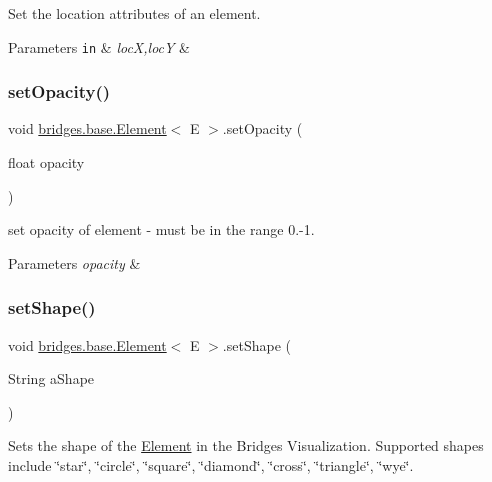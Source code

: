 Set the location attributes of an element. 


\begin{DoxyParams}[1]{Parameters}
\mbox{\tt in}  & {\em locX,locY} & \\
\hline
\end{DoxyParams}
\mbox{\label{classbridges_1_1base_1_1_element_a71c622f2cbb03b086c5a8f80d390b366}} 
\subsubsection{\texorpdfstring{set\+Opacity()}{setOpacity()}}
{\footnotesize\ttfamily void \hyperlink{classbridges_1_1base_1_1_element}{bridges.\+base.\+Element}$<$ E $>$.set\+Opacity (\begin{DoxyParamCaption}\item[{float}]{opacity }\end{DoxyParamCaption})}

set opacity of element -\/ must be in the range 0.-\/1.


\begin{DoxyParams}{Parameters}
{\em opacity} & \\
\hline
\end{DoxyParams}
\mbox{\label{classbridges_1_1base_1_1_element_ae65bfb47628e028c21c43553ef59b7a2}} 
\subsubsection{\texorpdfstring{set\+Shape()}{setShape()}}
{\footnotesize\ttfamily void \hyperlink{classbridges_1_1base_1_1_element}{bridges.\+base.\+Element}$<$ E $>$.set\+Shape (\begin{DoxyParamCaption}\item[{String}]{a\+Shape }\end{DoxyParamCaption})}

Sets the shape of the \hyperlink{classbridges_1_1base_1_1_element}{Element} in the Bridges Visualization. Supported shapes include \char`\"{}star\char`\"{}, \char`\"{}circle\char`\"{}, \char`\"{}square\char`\"{}, \char`\"{}diamond\char`\"{}, \char`\"{}cross\char`\"{}, \char`\"{}triangle\char`\"{}, \char`\"{}wye\char`\"{}.


